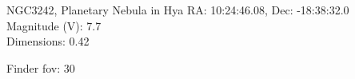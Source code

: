 \begin{block}{NGC3242, Planetary Nebula in Hya}
    RA: 10:24:46.08, Dec: -18:38:32.0 \\ 
    Magnitude (V): 7.7 \\ 
    Dimensions: 0.42 

    Finder fov: 30 
\end{block}